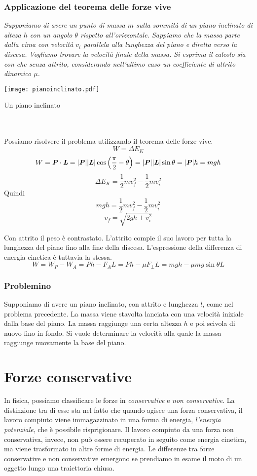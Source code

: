 \subsubsection*{Applicazione del teorema delle forze vive}
\textit{Supponiamo di avere un punto di massa $m$ sulla sommità di un piano
inclinato di alteza $h$ con un angolo $\theta$ rispetto all'orizzontale. Sappiamo
che la massa parte dalla cima con velocità $v_i$ parallela alla lunghezza del piano
e diretta verso la discesa. Vogliamo trovare la velocità finale della massa. Si
esprima il calcolo sia con che senza attrito, considerando nell'ultimo caso un
coefficiente di attrito dinamico $\mu$.}
\begin{marginfigure}
    \centering
    \texttt{[image: pianoinclinato.pdf]}
    \caption{Un piano inclinato}
\end{marginfigure}
\\\\
Possiamo risolvere il problema utilizzando il teorema delle forze vive.
\[ W = \Delta E_K \]
\[ W = \textbf{\textit{P}}\cdot\textbf{\textit{L}} = |\textbf{\textit{P}}||\textbf{\textit{L}}|\cos\left(\frac{\pi}{2} - \theta\right) = |\textbf{\textit{P}}||\textbf{\textit{L}}|\sin\theta = |\textbf{\textit{P}}|h = mgh \]
\[ \Delta E_K = \frac12mv_f^2 - \frac12mv_i^2 \]
Quindi
\[ mgh = \frac12mv_f^2 - \frac12mv_i^2 \]
\[ v_f = \sqrt{2gh + v_i^2} \]

Con attrito il peso è contrastato. L'attrito compie il suo lavoro per tutta la
lunghezza del piano fino alla fine della discesa. L'espressione della differenza
di energia cinetica è tuttavia la stessa.
\[ W = W_P - W_A = Ph - F_AL = Ph - \mu F_\perp L = mgh - \mu mg\sin\theta L \]


\subsubsection*{Problemino}
Supponiamo di avere un piano inclinato, con attrito e lunghezza $l$, come nel problema precedente.
La massa viene stavolta lanciata con una velocità iniziale dalla base del piano.
La massa raggiunge una certa altezza $h$ e poi scivola di nuovo fino in fondo. Si
vuole determinare la velocità alla quale la massa raggiunge nuovamente la base del
piano.

\section{Forze conservative}
In fisica, possiamo classificare le forze in \textit{conservative} e \textit{non
conservative}. La distinzione tra di esse sta nel fatto che quando agisce una
forza conservativa, il lavoro compiuto viene immagazzinato in una forma di energia,
\textit{l'energia potenziale}, che è possibile risprigionare. Il lavoro compiuto
da una forza non conservativa, invece, non può essere recuperato in seguito come
energia cinetica, ma viene trasformato in altre forme di energia. Le differenze tra
forze conservative e non conservative emergono se prendiamo in esame il moto di un
oggetto lungo una traiettoria chiusa.

